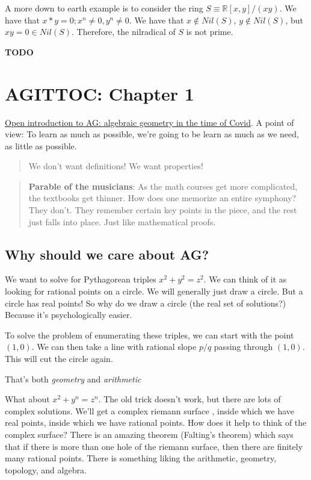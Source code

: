 \documentclass{book}
\theoremstyle{definition}
\begin{document}
A more down to earth example is to consider the ring $S \equiv \mathbb R[x, y] / (xy)$.
We have that $x * y = 0; x^n \neq 0, y^n \neq 0$. We have that $x \not \in Nil(S)$,
$y \not \in Nil(S)$, but $xy = 0 \in Nil(S)$. Therefore, the nilradical of $S$
is not prime.

\textbf{TODO}

\chapter{AGITTOC: Chapter 1}
\href{https://math216.wordpress.com/agittoc-2020/}{Open introduction to AG: algebraic geometry in the time of Covid}.
A point of view: To learn as much as possible, we're going to be learn
as much as we need, as little as possible.

\begin{quote} We don't want definitions! We want properties! \end{quote}

\begin{quote}
    \textbf{Parable of the musicians}: As the math courses get more complicated,
    the textbooks get thinner. How does one memorize an entire symphony? They don't.
    They remember certain key points in the piece, and the rest just falls into
    place. Just like mathematical proofs.
\end{quote}

\section{Why should we care about AG?}

We want to solve for Pythagorean triples $x^2 + y^2 = z^2$. We can think of it as looking for rational points
on a circle. We will generally just draw a circle. But a circle has real points!
So why do we draw a circle (the real set of solutions?) Because it's psychologically
easier.

To solve the problem of enumerating these triples, we can start with the point $(1, 0)$.
We can then take a line with rational slope $p/q$ passing through $(1, 0)$. 
This will cut the circle again. 

That's both \emph{geometry} and \emph{arithmetic}

What about $x^2 + y^n = z^n$. The old trick doesn't work, but there are lots
of complex solutions. We'll get a complex riemann surface , inside which we have
real points, inside which we have rational points. How does it help to think
of the complex surface? There is an amazing theorem (Falting's theorem) which
says that if there is more than one hole of the riemann surface, then there are
finitely many rational points. There is something liking the arithmetic, geometry,
topology, and algebra.
\end{document}
